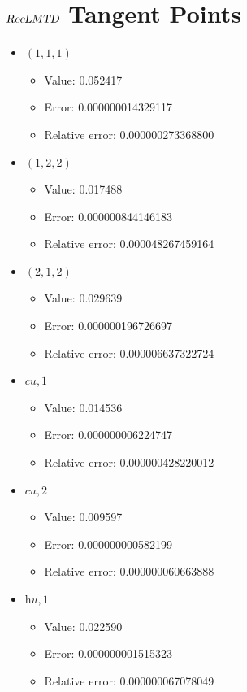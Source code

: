 \documentclass{article}%
\begin{document}
\section{$\textsl{RecLMTD}$ Tangent Points}%
\thispagestyle{plain}%
\begin{itemize}%
	\item $(1, 1, 1)$%
	\begin{itemize}%
		\item Value: 0.052417%
		\item Error: 0.000000014329117%
		\item Relative error: 0.000000273368800%
	\end{itemize}%
	\item $(1, 2, 2)$%
	\begin{itemize}%
		\item Value: 0.017488%
		\item Error: 0.000000844146183%
		\item Relative error: 0.000048267459164%
	\end{itemize}%
	\item $(2, 1, 2)$%
	\begin{itemize}%
		\item Value: 0.029639%
		\item Error: 0.000000196726697%
		\item Relative error: 0.000006637322724%
	\end{itemize}%
	\item $\textit{cu},1$%
	\begin{itemize}%
		\item Value: 0.014536%
		\item Error: 0.000000006224747%
		\item Relative error: 0.000000428220012%
	\end{itemize}%
	\item $\textit{cu},2$%
	\begin{itemize}%
		\item Value: 0.009597%
		\item Error: 0.000000000582199%
		\item Relative error: 0.000000060663888%
	\end{itemize}%
	\item $\textit{hu},1$%
	\begin{itemize}%
		\item Value: 0.022590%
		\item Error: 0.000000001515323%
		\item Relative error: 0.000000067078049%
	\end{itemize}%
\end{itemize}%
\end{document}
